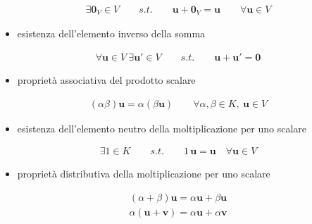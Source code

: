 \documentclass[letterpaper,10pt,italian]{jupyterBook}
\begin{document}
\begin{equation*}
\begin{split}\exists \mathbf{0}_V \in V \qquad s.t. \qquad \mathbf{u} + \mathbf{0}_V = \mathbf{u} \qquad \forall \mathbf{u} \in V\end{split}
\end{equation*}\begin{itemize}
\item {} 
\sphinxAtStartPar
esistenza dell’elemento inverso della somma

\end{itemize}
\begin{equation*}
\begin{split}\forall \mathbf{u} \in V \ \exists \mathbf{u}' \in V \qquad s.t. \qquad \mathbf{u} + \mathbf{u}' = \mathbf{0}\end{split}
\end{equation*}\begin{itemize}
\item {} 
\sphinxAtStartPar
proprietà associativa del prodotto scalare

\end{itemize}
\begin{equation*}
\begin{split}(\alpha \beta) \mathbf{u} = \alpha ( \beta \mathbf{u} ) \qquad \forall \alpha, \beta \in K, \ \mathbf{u} \in V\end{split}
\end{equation*}\begin{itemize}
\item {} 
\sphinxAtStartPar
esistenza dell’elemento neutro della moltiplicazione per uno scalare

\end{itemize}
\begin{equation*}
\begin{split}\exists 1 \in K \qquad s.t. \qquad 1 \, \mathbf{u} = \mathbf{u} \quad \forall \mathbf{u} \in V\end{split}
\end{equation*}\begin{itemize}
\item {} 
\sphinxAtStartPar
proprietà distributiva della moltiplicazione per uno scalare

\end{itemize}
\begin{equation*}
\begin{split}(\alpha + \beta) \mathbf{u} = \alpha \mathbf{u} + \beta \mathbf{u}\end{split}
\end{equation*}\begin{equation*}
\begin{split}\alpha (\mathbf{u} + \mathbf{v}) = \alpha \mathbf{u} + \alpha \mathbf{v} \end{split}
\end{equation*}
\end{document}
